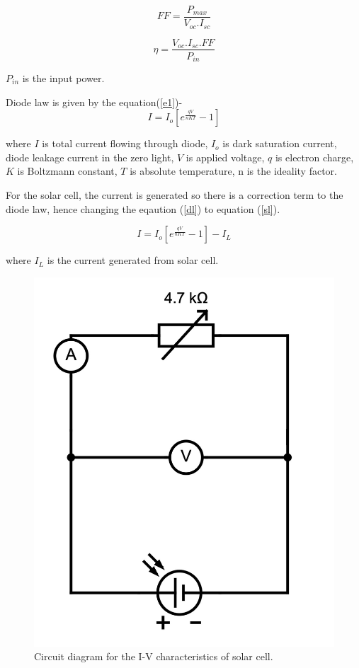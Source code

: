 \documentclass[a4paper, amsfonts, amssymb, amsmath, reprint, showkeys, nofootinbib, twoside]{revtex4-1}
\begin{document}
\begin{equation}\label{e1}
	FF=\frac{P_{max}}{V_{oc}.I_{sc}}
\end{equation}

\begin{equation}\label{e2}
	\eta=\frac{V_{oc}.I_{sc}.FF}{P_{in}}
\end{equation}

$P_{in}$ is the input power.

Diode law is given by the equation(\ref{e1})-
\begin{equation}\label{dl}
	I=I_o[e^{\frac{qV}{nKT}}-1]
\end{equation}

where $I$ is total current flowing through diode, $I_{o}$ is dark saturation current, diode leakage current in the zero light, $V$ is applied voltage, $q$ is electron charge, $K$ is Boltzmann constant, $T$ is absolute temperature, n is the ideality factor.

For the solar cell, the current is generated so there is a correction term to the diode law, hence changing the eqaution (\ref{dl}) to equation (\ref{sl}).

\begin{equation}\label{sl}
	I=I_o[e^{\frac{qV}{nKT}}-1]-I_{L}
\end{equation} 

where $I_{L}$ is the current generated from solar cell.

\begin{figure}[H]
	\centering
	\includegraphics[scale=0.15]{1} 
	\caption{Circuit diagram for the I-V characteristics of solar cell.}
	\label{c}
\end{figure}
\end{document}
